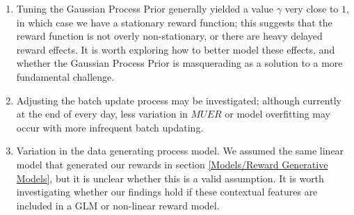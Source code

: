 \begin{enumerate}
	\item Tuning the Gaussian Process Prior generally yielded a value $\gamma$ very close to $1$, in which case we have a stationary reward function; this suggests that the reward function is not overly non-stationary, or there are heavy delayed reward effects.  It is worth exploring how to better model these effects, and whether the Gaussian Process Prior is masquerading as a solution to a more fundamental challenge.
	\item Adjusting the batch update process may be investigated; although currently at the end of every day, less variation in $MUER$ or model overfitting may occur with more infrequent batch updating.
	\item Variation in the data generating process model.  We assumed the same linear model that generated our rewards in section \ref{Models/Reward Generative Models}, but it is unclear whether this is a valid assumption.  It is worth investigating whether our findings hold if these contextual features are included in a GLM or non-linear reward model.
\end{enumerate}